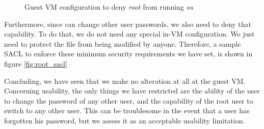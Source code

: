 \begin{figure}[ht]
	\centering
	\caption{Guest \ac{VM} configuration to deny \emph{root} from running \emph{su}}
	\label{fig:pam}
\end{figure}

\par Furthermore, since  can change other user passwords, we also need to deny that capability. To do that, we do not need any special in-\ac{VM} configuration. We just need to protect the  file from being modified by anyone. Therefore, a sample \ac{SACL} to enforce these minimum security requirements we have set, is shown in figure \ref{fig:root_sacl}


\par Concluding, we have seen that we make no alteration at all at the guest \ac{VM}. Concerning usability, the only things we have restricted are the ability of the  user to change the password of any other user, and the capability of the root user to switch to any other user. This can be troublesome in the event that a user has forgotten his password, but we assess it as an acceptable usability limitation.











